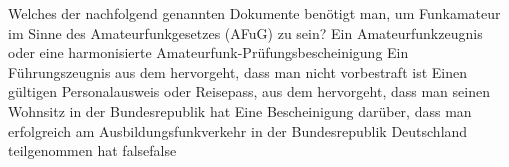     {Welches der nachfolgend genannten Dokumente benötigt man, um Funkamateur im Sinne des Amateurfunkgesetzes (AFuG) zu sein?}
    {Ein Amateurfunkzeugnis oder eine harmonisierte Amateurfunk-Prüfungsbescheinigung}
    {Ein Führungszeugnis aus dem hervorgeht, dass man nicht vorbestraft ist}
    {Einen gültigen Personalausweis oder Reisepass, aus dem hervorgeht, dass man seinen Wohnsitz in der Bundesrepublik hat}
    {Eine Bescheinigung darüber, dass man erfolgreich am Ausbildungsfunkverkehr in der Bundesrepublik Deutschland teilgenommen hat}
    {false}{false}
